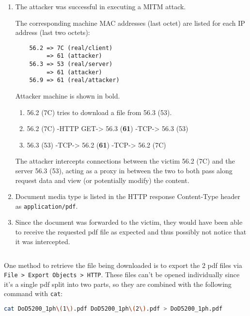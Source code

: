\documentclass[12pt]{exam}
\begin{document}
\begin{enumerate}[label=\alph*)]
    \item The attacker was successful in executing a MITM attack.

    The corresponding machine MAC addresses (last octet) are listed for each IP
    address (last two octets):

    \begin{lstlisting}
    56.2 => 7C (real/client)
         => 61 (attacker)
    56.3 => 53 (real/server)
         => 61 (attacker)
    56.9 => 61 (real/attacker)
    \end{lstlisting}

    Attacker machine is shown in bold.

    \begin{enumerate}[label=\arabic*)]
        \item 56.2 (7C) tries to download a file from 56.3 (53).
        \item 56.2 (7C) -HTTP GET-> 56.3 (\textbf{61}) -TCP-> 56.3 (53)
        \item 56.3 (53) -TCP-> 56.2 (\textbf{61}) -TCP-> 56.2 (7C)
    \end{enumerate}

    The attacker intercepts connections between the victim 56.2 (7C) and the
    server 56.3 (53), acting as a proxy in between the two to both pass along
    request data and view (or potentially modify) the content.

    \item Document media type is listed in the HTTP response Content-Type header
    as \lstinline{application/pdf}.
    \item Since the document was forwarded to the victim, they would have been
    able to receive the requested pdf file as expected and thus possibly not
    notice that it was intercepted.
\end{enumerate}

\subsection{}

One method to retrieve the file being downloaded is to export the 2 pdf files
via \lstinline{File > Export Objects > HTTP}.  These files can't be opened
individually since it's a single pdf split into two parts, so they are combined
with the following command with \lstinline{cat}:

\begin{lstlisting}[language=bash]
    cat DoD5200_1ph\(1\).pdf DoD5200_1ph\(2\).pdf > DoD5200_1ph.pdf
\end{lstlisting}
\end{document}

